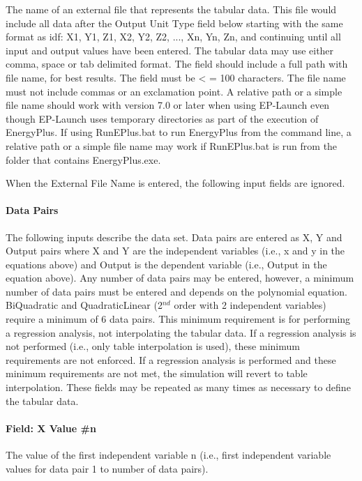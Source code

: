 The name of an external file that represents the tabular data. This file would include all data after the Output Unit Type field below starting with the same format as idf: X1, Y1, Z1, X2, Y2, Z2, ..., Xn, Yn, Zn, and continuing until all input and output values have been entered. The tabular data may use either comma, space or tab delimited format. The field should include a full path with file name, for best results. The field must be \textless{} = 100 characters. The file name must not include commas or an exclamation point. A relative path or a simple file name should work with version 7.0 or later when using EP-Launch even though EP-Launch uses temporary directories as part of the execution of EnergyPlus. If using RunEPlus.bat to run EnergyPlus from the command line, a relative path or a simple file name may work if RunEPlus.bat is run from the folder that contains EnergyPlus.exe.

When the External File Name is entered, the following input fields are ignored. 

\paragraph{Data Pairs}\label{data-pairs-1}

The following inputs describe the data set. Data pairs are entered as X, Y and Output pairs where X and Y are the independent variables (i.e., x and y in the equations above) and Output is the dependent variable (i.e., Output in the equation above). Any number of data pairs may be entered, however, a minimum number of data pairs must be entered and depends on the polynomial equation. BiQuadratic and QuadraticLinear (2\(^{nd}\) order with 2 independent variables) require a minimum of 6 data pairs. This minimum requirement is for performing a regression analysis, not interpolating the tabular data. If a regression analysis is not performed (i.e., only table interpolation is used), these minimum requirements are not enforced. If a regression analysis is performed and these minimum requirements are not met, the simulation will revert to table interpolation. These fields may be repeated as many times as necessary to define the tabular data.

\paragraph{Field: X Value \#n}\label{field-x-value-n-1}

The value of the first independent variable n (i.e., first independent variable values for data pair 1 to number of data pairs).

